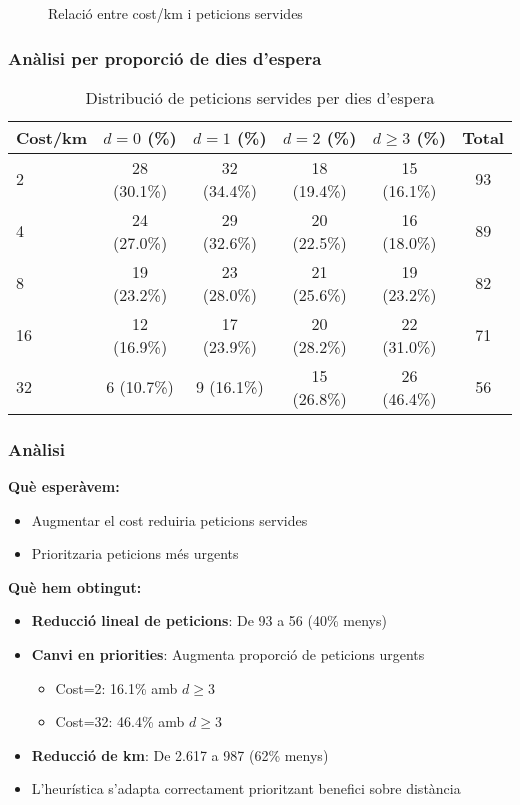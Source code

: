 \begin{figure}[H]
\centering
\caption{Relació entre cost/km i peticions servides}
\label{fig:exp6-cost}
\end{figure}

\subsubsection{Anàlisi per proporció de dies d'espera}

\begin{table}[H]
\centering
\begin{tabular}{@{}lccccc@{}}
\toprule
\textbf{Cost/km} & \textbf{$d=0$ (\%)} & \textbf{$d=1$ (\%)} & \textbf{$d=2$ (\%)} & \textbf{$d \geq 3$ (\%)} & \textbf{Total} \\
\midrule
2 & 28 (30.1\%) & 32 (34.4\%) & 18 (19.4\%) & 15 (16.1\%) & 93 \\
4 & 24 (27.0\%) & 29 (32.6\%) & 20 (22.5\%) & 16 (18.0\%) & 89 \\
8 & 19 (23.2\%) & 23 (28.0\%) & 21 (25.6\%) & 19 (23.2\%) & 82 \\
16 & 12 (16.9\%) & 17 (23.9\%) & 20 (28.2\%) & 22 (31.0\%) & 71 \\
32 & 6 (10.7\%) & 9 (16.1\%) & 15 (26.8\%) & 26 (46.4\%) & 56 \\
\bottomrule
\end{tabular}
\caption{Distribució de peticions servides per dies d'espera}
\label{tab:exp6-distribucio}
\end{table}

\subsubsection{Anàlisi}

\textbf{Què esperàvem:}
\begin{itemize}
    \item Augmentar el cost reduiria peticions servides
    \item Prioritzaria peticions més urgents
\end{itemize}

\textbf{Què hem obtingut:}
\begin{itemize}
    \item \textbf{Reducció lineal de peticions}: De 93 a 56 (40\% menys)
    \item \textbf{Canvi en priorities}: Augmenta proporció de peticions urgents
    \begin{itemize}
        \item Cost=2: 16.1\% amb $d \geq 3$
        \item Cost=32: 46.4\% amb $d \geq 3$
    \end{itemize}
    \item \textbf{Reducció de km}: De 2.617 a 987 (62\% menys)
    \item L'heurística s'adapta correctament prioritzant benefici sobre distància
\end{itemize}

